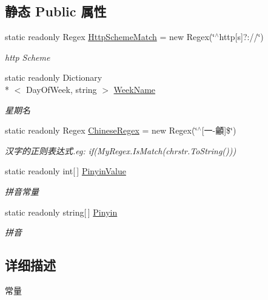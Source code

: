\subsection*{静态 Public 属性}
\begin{DoxyCompactItemize}
\item 
static readonly Regex \hyperlink{class_x_c_l_net_tools_1_1_common_1_1_consts_a1458296b2ab205e2507639325a606806}{Http\-Scheme\-Match} = new Regex(\char`\"{}$^\wedge$http\mbox{[}s\mbox{]}?\-://\char`\"{})
\begin{DoxyCompactList}\small\item\em http Scheme \end{DoxyCompactList}\item 
static readonly Dictionary\\*
$<$ Day\-Of\-Week, string $>$ \hyperlink{class_x_c_l_net_tools_1_1_common_1_1_consts_a1ceb25b42170e8a15fe9953a531c497e}{Week\-Name}
\begin{DoxyCompactList}\small\item\em 星期名 \end{DoxyCompactList}\item 
static readonly Regex \hyperlink{class_x_c_l_net_tools_1_1_common_1_1_consts_a55c7e91b6ab823a657306b4c1bb9d37a}{Chinese\-Regex} = new Regex(\char`\"{}$^\wedge$\mbox{[}一-\/龥\mbox{]}\$\char`\"{})
\begin{DoxyCompactList}\small\item\em 汉字的正则表达式.\-eg\-: if(My\-Regex.\-Is\-Match(chrstr.\-To\-String())) \end{DoxyCompactList}\item 
static readonly int\mbox{[}$\,$\mbox{]} \hyperlink{class_x_c_l_net_tools_1_1_common_1_1_consts_ac245eab4dfd8a9a9769a223f8f10f86a}{Pinyin\-Value}
\begin{DoxyCompactList}\small\item\em 拼音常量 \end{DoxyCompactList}\item 
static readonly string\mbox{[}$\,$\mbox{]} \hyperlink{class_x_c_l_net_tools_1_1_common_1_1_consts_af7c3e080af79d5034491651156a08f80}{Pinyin}
\begin{DoxyCompactList}\small\item\em 拼音 \end{DoxyCompactList}\end{DoxyCompactItemize}


\subsection{详细描述}
常量 



